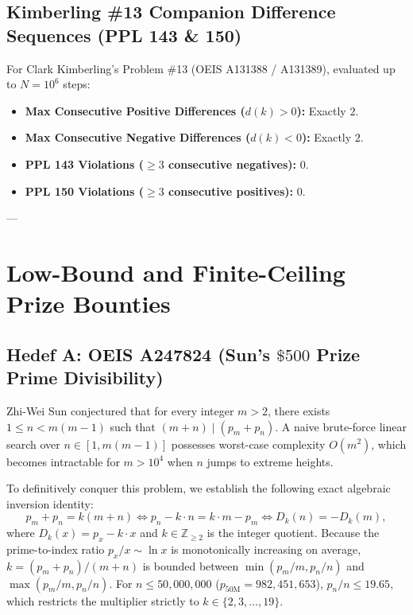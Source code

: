 \documentclass[11pt,a4paper]{article}
\theoremstyle{definition}
\theoremstyle{remark}
\begin{document}
\subsection{Kimberling \#13 Companion Difference Sequences (PPL 143 \& 150)}
For Clark Kimberling's Problem \#13 (OEIS A131388 / A131389), evaluated up to $N = 10^6$ steps:
\begin{itemize}
    \item \textbf{Max Consecutive Positive Differences ($d(k) > 0$):} Exactly $2$.
    \item \textbf{Max Consecutive Negative Differences ($d(k) < 0$):} Exactly $2$.
    \item \textbf{PPL 143 Violations ($\ge 3$ consecutive negatives):} $0$.
    \item \textbf{PPL 150 Violations ($\ge 3$ consecutive positives):} $0$.
\end{itemize}

---

\section{Low-Bound and Finite-Ceiling Prize Bounties}

\subsection{Hedef A: OEIS A247824 (Sun's $\$500$ Prize Prime Divisibility)}
Zhi-Wei Sun conjectured that for every integer $m > 2$, there exists $1 \le n < m(m-1)$ such that $(m + n) \mid (p_m + p_n)$. A naive brute-force linear search over $n \in [1, m(m-1)]$ possesses worst-case complexity $O(m^2)$, which becomes intractable for $m > 10^4$ when $n$ jumps to extreme heights.

To definitively conquer this problem, we establish the following exact algebraic inversion identity:
\begin{equation}
    p_m + p_n = k(m + n) \iff p_n - k \cdot n = k \cdot m - p_m \iff D_k(n) = -D_k(m),
\end{equation}
where $D_k(x) = p_x - k \cdot x$ and $k \in \mathbb{Z}_{\ge 2}$ is the integer quotient. Because the prime-to-index ratio $p_x/x \sim \ln x$ is monotonically increasing on average, $k = (p_m + p_n)/(m + n)$ is bounded between $\min(p_m/m, p_n/n)$ and $\max(p_m/m, p_n/n)$. For $n \le 50,000,000$ ($p_{50\text{M}} = 982,451,653$), $p_n/n \le 19.65$, which restricts the multiplier strictly to $k \in \{2, 3, \dots, 19\}$.
\end{document}
